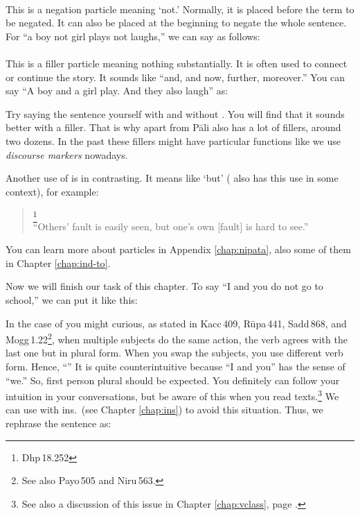 \paragraph{} This is a negation particle meaning `not.' Normally, it is placed before the term to be negated. It can also be placed at the beginning to negate the whole sentence. For ``a boy not girl plays not laughs,'' we can say as follows:


\paragraph{} This is a filler particle meaning nothing substantially. It is often used to connect or continue the story. It sounds like ``and, and now, further, moreover.'' You can say ``A boy and a girl play. And they also laugh'' as:


Try saying the sentence yourself with and without . You will find that it sounds better with a filler. That is why apart from  P\=ali also has a lot of fillers, around two dozens. In the past these fillers might have particular functions like we use \emph{discourse markers} nowadays.

Another use of  is in contrasting. It means like `but' ( also has this use in some context), for example:

\begin{quote}
\footnote{Dhp\,18.252}\\
``Others' fault is easily seen, but one's own [fault] is hard to see.'' \\
\end{quote}

You can learn more about particles in Appendix \ref{chap:nipata}, also some of them in Chapter \ref{chap:ind-to}.

Now we will finish our task of this chapter. To say ``I and you do not go to school,'' we can put it like this:


In the case of you might curious, as stated in Kacc\,409, R\=upa\,441, Sadd\,868, and Mogg\,1.22\footnote{See also Payo\,505 and Niru\,563.}, when multiple subjects do the same action, the verb agrees with the last one but in plural form. When you swap the subjects, you use different verb form. Hence, ``'' It is quite counterintuitive because ``I and you'' has the sense of ``we.'' So, first person plural should be expected. You definitely can follow your intuition in your conversations, but be aware of this when you read texts.\footnote{See also a discussion of this issue in Chapter \ref{chap:vclass}, page \pageref{par:multiactors}.} We can use  with ins.\ (see Chapter \ref{chap:ins}) to avoid this situation. Thus, we rephrase the sentence as:

